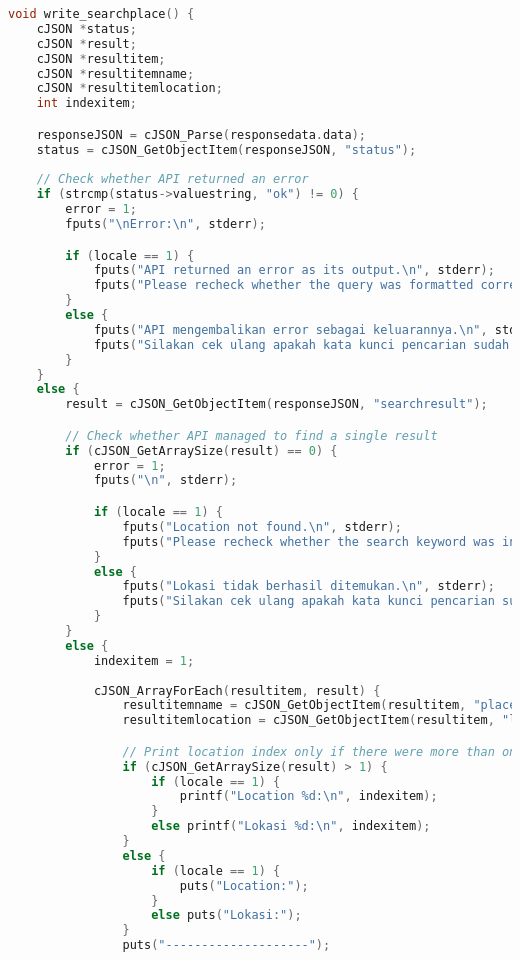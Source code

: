 \begin{lstlisting}[label={appdx:A-write-searchplace}, language=C, caption=\texttt{write\textunderscore searchplace()}]
void write_searchplace() {
    cJSON *status;
    cJSON *result;
    cJSON *resultitem;
    cJSON *resultitemname;
    cJSON *resultitemlocation;
    int indexitem;

    responseJSON = cJSON_Parse(responsedata.data);
    status = cJSON_GetObjectItem(responseJSON, "status");
    
    // Check whether API returned an error
    if (strcmp(status->valuestring, "ok") != 0) {
        error = 1;
        fputs("\nError:\n", stderr);

        if (locale == 1) {
            fputs("API returned an error as its output.\n", stderr);
            fputs("Please recheck whether the query was formatted correctly.\n", stderr);
        }
        else {
            fputs("API mengembalikan error sebagai keluarannya.\n", stderr);
            fputs("Silakan cek ulang apakah kata kunci pencarian sudah diformat dengan benar.\n", stderr);
        }
    }
    else {
        result = cJSON_GetObjectItem(responseJSON, "searchresult");

        // Check whether API managed to find a single result
        if (cJSON_GetArraySize(result) == 0) {
            error = 1;
            fputs("\n", stderr);

            if (locale == 1) {
                fputs("Location not found.\n", stderr);
                fputs("Please recheck whether the search keyword was inputted correctly.\n", stderr);
            }
            else {
                fputs("Lokasi tidak berhasil ditemukan.\n", stderr);
                fputs("Silakan cek ulang apakah kata kunci pencarian sudah dimasukkan dengan benar.\n", stderr);
            }
        }
        else {
            indexitem = 1;
            
            cJSON_ArrayForEach(resultitem, result) {
                resultitemname = cJSON_GetObjectItem(resultitem, "placename");
                resultitemlocation = cJSON_GetObjectItem(resultitem, "location");

                // Print location index only if there were more than one found
                if (cJSON_GetArraySize(result) > 1) {
                    if (locale == 1) {
                        printf("Location %d:\n", indexitem);
                    }
                    else printf("Lokasi %d:\n", indexitem);
                }
                else {
                    if (locale == 1) {
                        puts("Location:");
                    }
                    else puts("Lokasi:");
                }
                puts("--------------------");


\end{lstlisting}

